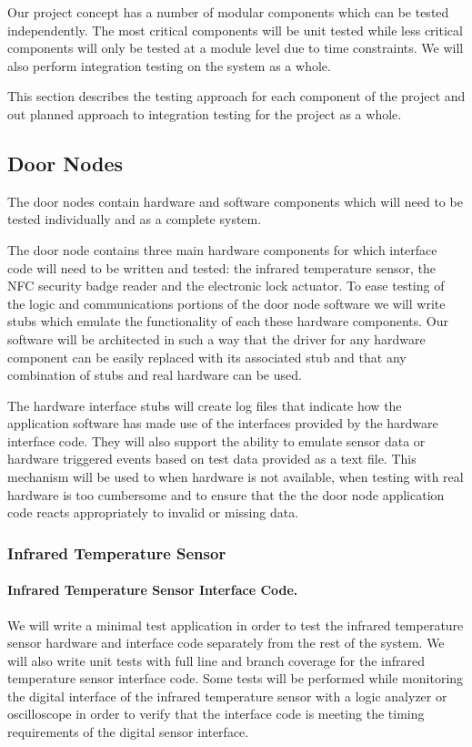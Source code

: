 Our project concept has a number of modular components which can be tested
independently. The most critical components will be unit tested while less
critical components will only be tested at a module level due to time
constraints. We will also perform integration testing on the system as a whole.

This section describes the testing approach for each component of the project
and out planned approach to integration testing for the project as a whole.

\subsection{Door Nodes}

The door nodes contain hardware and software components which will need to be
tested individually and as a complete system.

The door node contains three main hardware components for which interface code
will need to be written and tested: the infrared temperature sensor, the NFC
security badge reader and the electronic lock actuator. To ease testing of the logic and
communications portions of the door node software we will write stubs which
emulate the functionality of each these hardware components. Our software will
be architected in such a way that the driver for any hardware component can be
easily replaced with its associated stub and that any combination of stubs and
real hardware can be used.

The hardware interface stubs will create log files that indicate how the
application software has made use of the interfaces provided by the hardware
interface code. They will also support the ability to emulate sensor data or
hardware triggered events based on test data provided as a text file. This
mechanism will be used to when hardware is not available, when testing with real
hardware is too cumbersome and to ensure that the the door node application code
reacts appropriately to invalid or missing data.

\subsubsection{Infrared Temperature Sensor}

\paragraph{Infrared Temperature Sensor Interface Code.}
We will write a minimal test application in order to test the infrared temperature sensor
hardware and interface code separately from the rest of the system. We will also
write unit tests with full line and branch coverage for the infrared temperature sensor
interface code. Some tests will be performed while monitoring the digital
interface of the infrared temperature sensor with a logic analyzer or oscilloscope in
order to verify that the interface code is meeting the timing requirements of
the digital sensor interface.

